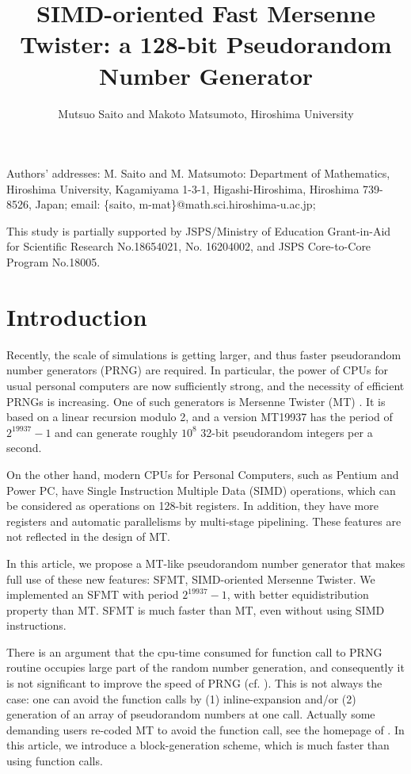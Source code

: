 \documentclass[acmnow]{acmtrans2m}
\title{SIMD-oriented Fast Mersenne Twister:
a 128-bit Pseudorandom Number Generator
}
\author{Mutsuo Saito and Makoto Matsumoto, Hiroshima University \\
}
\begin{document}
\maketitle

\begin{bottomstuff}
Authors' addresses: 
M. Saito and M. Matsumoto: Department of Mathematics, Hiroshima University,
Kagamiyama 1-3-1, Higashi-Hiroshima, Hiroshima 739-8526, Japan;
email: \{saito, m-mat\}@math.sci.hiroshima-u.ac.jp;

This study is partially supported by JSPS/Ministry of Education
Grant-in-Aid for Scientific Research No.18654021, No. 16204002,
and JSPS Core-to-Core Program No.18005.
\end{bottomstuff}

\section{Introduction}
Recently, the scale of simulations is getting larger,
and thus faster pseudorandom number generators (PRNG)
are required. In particular, the power of CPUs for
usual personal computers are now sufficiently strong,
and the necessity of efficient PRNGs is increasing.
One of such generators is Mersenne Twister (MT) \cite{MT}.
It is based on a linear recursion modulo 2, 
and a version MT19937 has the period of $2^{19937}-1$ and can generate
roughly $10^8$ 32-bit pseudorandom integers per a second.

On the other hand, modern CPUs for Personal Computers,
such as Pentium and Power PC, have 
Single Instruction Multiple Data (SIMD) operations,
which can be considered as operations 
on 128-bit registers. In addition, they have more registers
and automatic parallelisms by multi-stage pipelining. These features
are not reflected in the design of MT. 

In this article, we propose a MT-like 
pseudorandom number generator
that makes full use of these new features: SFMT, 
SIMD-oriented Mersenne Twister. 
We implemented an SFMT with period $2^{19937}-1$,
with better equidistribution property than MT. 
SFMT is much faster than MT, even without using SIMD instructions. 

There is an argument that the cpu-time consumed for 
function call to PRNG routine occupies large part of
the random number generation, and consequently 
it is not significant to improve the speed of PRNG 
(cf. \cite{XORSHIFT}).
This is not always the case: 
one can avoid the function calls by (1) inline-expansion
and/or (2) generation of an array of pseudorandom numbers
at one call. Actually some demanding users re-coded MT to avoid the 
function call, see the homepage of \cite{MT}. 
In this article, we introduce a block-generation scheme, which 
is much faster than using function calls.
\end{document}
